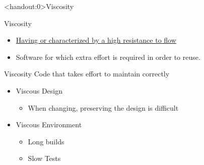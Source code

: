 \documentclass[xcolor=svgnames, handout]{beamer}
\begin{document}

{%
%
\begin{frame}<handout:0>{Viscosity}
\end{frame}
}

{%
%
\begin{frame}{Viscosity}

    \begin{itemize}
        \item \href{https://www.merriam-webster.com/dictionary/viscous}
            {Having or characterized by a high resistance to flow}
        \item<2-> Software for which extra effort is required in order to reuse.
    \end{itemize}
\end{frame}
}


{%
%
\begin{frame}{Viscosity}
    Code that takes effort to maintain correctly

    \begin{itemize}
        \item<2->Viscous Design
        \begin{itemize}
            \item<4->When changing, preserving the design is difficult
        \end{itemize}
        \item<3->Viscous Environment
        \begin{itemize}
            \item<5->Long builds
            \item<6->Slow Tests
        \end{itemize}
    \end{itemize}
\end{frame}
}

\end{document}
